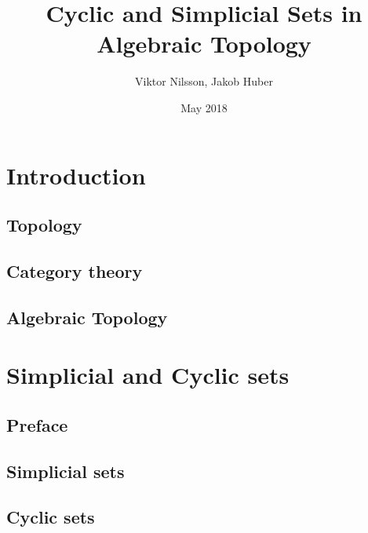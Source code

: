 \documentclass{report}
\title{Cyclic and Simplicial Sets in Algebraic Topology}
\author{Viktor Nilsson, Jakob Huber}
\date{May 2018}
\theoremstyle{definition}
\begin{document}
    \maketitle
    
    \begin{abstract}
        
    \end{abstract}
    
    \tableofcontents
    
    \chapter{Introduction}
        
        
        \section{Topology}
            
        \section{Category theory}
            
        \section{Algebraic Topology}
            
    
    \chapter{Simplicial and Cyclic sets}
        \section{Preface}
            
        \section{Simplicial sets}
            
        \section{Cyclic sets}
            
    
    \printbibliography
\end{document}
